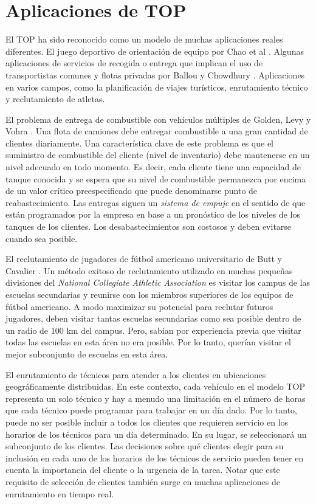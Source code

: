\section{Aplicaciones de TOP}

El TOP ha sido reconocido como un modelo de muchas aplicaciones reales diferentes. El juego deportivo de orientación de equipo por Chao et al \cite{ChaoGoldenWasil}. Algunas aplicaciones de servicios de recogida o entrega que implican el uso de transportistas comunes y flotas privadas por Ballou y Chowdhury \cite{BallouChowdhury}. Aplicaciones en varios campos, como la planificación de viajes turísticos, enrutamiento técnico y reclutamiento de atletas.

\bigskip

El problema de entrega de combustible con vehículos múltiples de Golden, Levy y Vohra \cite{goldenlevyvohra}. Una flota de camiones debe entregar combustible a una gran cantidad de clientes diariamente. Una característica clave de este problema es que el suministro de combustible del cliente (nivel de inventario) debe mantenerse en un nivel adecuado en todo momento. Es decir, cada cliente tiene una capacidad de tanque conocida y se espera que su nivel de combustible permanezca por encima de un valor crítico preespecificado que puede denominarse punto de reabastecimiento. Las entregas siguen un \textit{sistema de empuje} en el sentido de que están programados por la empresa en base a un pronóstico de los niveles de los tanques de los clientes. Los desabastecimientos son costosos y deben evitarse cuando sea posible.

\bigskip

El reclutamiento de jugadores de fútbol americano universitario de Butt y Cavalier \cite{ButtCavalier}. Un método exitoso de reclutamiento utilizado en muchas pequeñas divisiones del \textit{National Collegiate Athletic Association} es visitar los campus de las escuelas secundarias y reunirse con los miembros superiores de los equipos de fútbol americano. A modo maximizar su potencial para reclutar futuros jugadores, deben visitar tantas escuelas secundarias como sea posible dentro de un radio de 100 km del campus. Pero, sabían por experiencia previa que visitar todas las escuelas en esta área no era posible. Por lo tanto, querían visitar el mejor subconjunto de escuelas en esta área.

\bigskip

El enrutamiento de técnicos para atender a los clientes en ubicaciones geográficamente distribuidas. En este contexto, cada vehículo en el modelo TOP representa un solo técnico y hay a menudo una limitación en el número de horas que cada técnico puede programar para trabajar en un día dado. Por lo tanto, puede no ser posible incluir a todos los clientes que requieren servicio en los horarios de los técnicos para un día determinado. En su lugar, se seleccionará un subconjunto de los clientes. Las decisiones sobre qué clientes elegir para su inclusión en cada uno de los horarios de los técnicos de servicio pueden tener en cuenta la importancia del cliente o la urgencia de la tarea. Notar que este requisito de selección de clientes también surge en muchas aplicaciones de enrutamiento en tiempo real.

